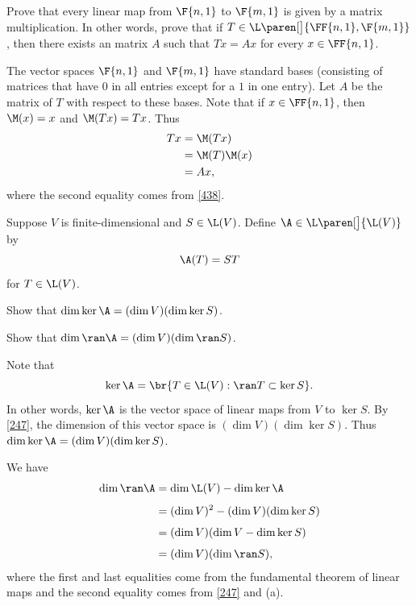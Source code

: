 \exercise
Prove that every linear map from $\F{n,1}$ to $\F{m,1}$ is given by a matrix multiplication.  In other words, prove that if
$T \in \L\paren[\big]{\FF{n,1}, \F{m,1}}$, then there exists an  matrix $A$ such that $Tx = Ax$ for every $x \in \FF{n,1}$.

\begin{Solution}
The vector spaces $\F{n,1}$ and $\F{m,1}$ have standard bases
(consisting of matrices that have $0$ in all entries except for a $1$ in one entry).
Let $A$ be the matrix of $T$ with respect to these bases.  Note that if $x \in
\FF{n,1}$, then $\M(x) = x$ and
$\M(Tx) = Tx$.  Thus
\begin{align*}
Tx &= \M(Tx) \\
&= \M(T) \M(x) \\
&= A x,
\end{align*}
where the second equality comes from \ref{438}.
\end{Solution}

\exercise
Suppose $V$ is finite-dimensional and $S \in \L(V)$. Define $\A \in \L\paren[\big]{\L(V)}$ by
\[
\A(T) = ST
\vspace{-6bp}
\]
for $T \in \L(V)$.
\begin{subtheorem}
\item
Show that $\dim \ker \A  = (\dim V)(\dim \ker S)$.
\item
Show that $\dim \ran \A  = (\dim V)(\dim \ran S)$.
\end{subtheorem}
\exercisesubtheoremend

\begin{Solution}
\begin{subtheorem}
\item
Note that
\[
\ker \A = \br{T \in \L(V): \ran T \subset \ker S}.
\]
In other words, $\ker \A$ is the vector space of linear maps from $V$ to $\ker S$. By \ref{247}, the dimension of this vector space is
$(\dim V)(\dim \ker S)$. Thus $\dim \ker \A  = (\dim V)(\dim \ker S)$.

\item
We have
\begin{align*}
\dim \ran \A &= \dim \L(V) - \dim \ker \A \\[4bp]
&= (\dim V)^2 - (\dim V)(\dim \ker S) \\[4bp]
&= (\dim V) (\dim V - \dim \ker S) \\[4bp]
&= (\dim V)(\dim \ran S),
\end{align*}
where the first and last equalities come from the fundamental theorem of linear maps and the second equality comes from \ref{247} and (a).
\end{subtheorem}
\end{Solution}

